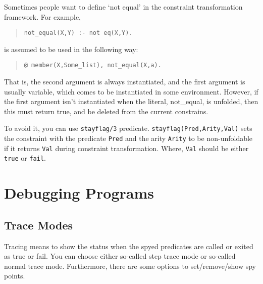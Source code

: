 Sometimes people want to define `not equal' in the constraint
transformation framework. For example,

\begin{quote}
        {\tt not\_equal(X,Y) :- not eq(X,Y).}
\end{quote}

is assumed to be used in the following way:

\begin{quote}
        {\tt @ member(X,Some\_list), not\_equal(X,a).}
\end{quote}

That is, the second argument is always instantiated, and the first
argument is usually variable, which comes to be instantiated in some
environment. However, if the first argument isn't instantiated when the
literal, not\_equal, is unfolded, then this must return true, and be
deleted from the current constrains.

To avoid it, you can use {\tt stayflag/3} predicate. 
{\tt stayflag(Pred,Arity,Val)} sets the
constraint with the predicate {\tt Pred} and the arity {\tt Arity} 
to be non-unfoldable if it returns {\tt Val}  during constraint 
transformation. Where, {\tt Val} should be either {\tt true} or {\tt fail}.

\section{Debugging Programs}

\subsection{Trace Modes}
Tracing means to show the status when the spyed predicates are called or
exited as true or fail.  You can choose either so-called step trace mode
or so-called normal trace mode. Furthermore, there are some options to
set/remove/show spy points. 

